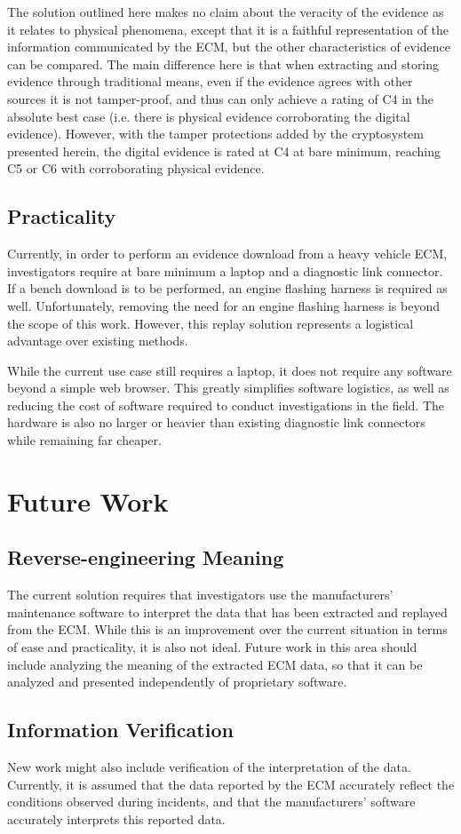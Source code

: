 The solution outlined here makes no claim about the veracity of the evidence as it relates to physical phenomena, except that it is a faithful representation of the information communicated
by the ECM, but the other characteristics of evidence can be compared. The main difference here is that when extracting and storing evidence through traditional means, even if the
evidence agrees with other sources it is not tamper-proof, and thus can only achieve a rating of C4 in the absolute best case (i.e. there is physical evidence corroborating the 
digital evidence). However, with the tamper protections added by the cryptosystem presented herein, the digital evidence is rated at C4 at bare minimum, reaching C5 or C6 with corroborating
physical evidence.

\subsection{Practicality}

Currently, in order to perform an evidence download from a heavy vehicle ECM, investigators require at bare minimum a laptop and a diagnostic link connector.
If a bench download is to be performed, an engine flashing harness is required as well. Unfortunately, removing the need for an engine flashing harness is
beyond the scope of this work. However, this replay solution represents a logistical advantage over existing methods.

While the current use case still requires a laptop, it does not require any software beyond a simple web browser. This greatly simplifies software logistics, as well
as reducing the cost of software required to conduct investigations in the field. The hardware is also no larger or heavier than existing diagnostic link connectors
while remaining far cheaper.

\section{Future Work}

\subsection{Reverse-engineering Meaning}

The current solution requires that investigators use the manufacturers' maintenance software to interpret the data that has been extracted and replayed from the ECM.
While this is an improvement over the current situation in terms of ease and practicality, it is also not ideal. Future work in this area should include analyzing the
meaning of the extracted ECM data, so that it can be analyzed and presented independently of proprietary software.

\subsection{Information Verification}

New work might also include verification of the interpretation of the data. Currently, it is assumed that the data reported by the ECM accurately reflect the conditions
observed during incidents, and that the manufacturers' software accurately interprets this reported data. 
